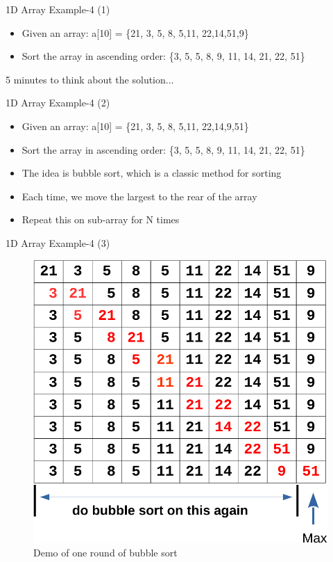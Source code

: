 \begin{frame}{1D Array Example-4 (1)}
	\begin{itemize}
		\item {Given an array: a[10] = \{21, 3, 5, 8, 5,11, 22,14,51,9\}}
		\item {Sort the array in ascending order: \{3, 5, 5, 8, 9, 11, 14, 21, 22, 51\}}
	\end{itemize}
	\vspace{0.2in}
	\begin{center}
		\Large{5 minutes to think about the solution...}
	\end{center}
\end{frame}

\begin{frame}{1D Array Example-4 (2)}
	\begin{itemize}
		\item {Given an array: a[10] = \{21, 3, 5, 8, 5,11, 22,14,9,51\}}
		\item {Sort the array in ascending order: \{3, 5, 5, 8, 9, 11, 14, 21, 22, 51\}}
	\end{itemize}
	\begin{itemize}
		\item {The idea is bubble sort, which is a classic method for sorting}
		\item {Each time, we move the largest to the rear of the array}
		\item {Repeat this on sub-array for N times}
	\end{itemize}
\end{frame}

\begin{frame}{1D Array Example-4 (3)}
\begin{figure}
	\includegraphics[width=0.55\linewidth]{figs/bubblesort.pdf}
	\caption{Demo of one round of bubble sort}
\end{figure}
\end{frame}

